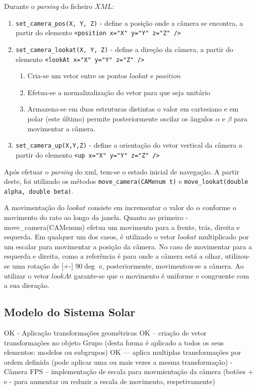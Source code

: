 \documentclass[runningheads]{llncs}
\begin{document}
Durante o \textit{parsing} do ficheiro $XML$:
\begin{enumerate}
    \item \texttt{set_camera_pos(X, Y, Z)} - define a posição onde a câmera se encontra,
    a partir do elemento \texttt{<position x="X" y="Y" z="Z" />}
    \item \texttt{set_camera_lookat(X, Y, Z)} - define a direção da câmera,
    a partir do elemento \texttt{<lookAt x="X" y="Y" z="Z" />}
    \begin{enumerate}
        \item Cria-se um vetor entre os pontos $lookat$ e $position$
        \item Efetua-se a normalizalização do vetor para que seja unitário
        \item Armazena-se em duas estruturas distintas o valor em cartesiano e em polar
        (este último) permite posteriormente oscilar os ângulos $\alpha$ e $\beta$ para movimentar a câmera.
    \end{enumerate}
    \item \texttt{set_camera_up(X,Y,Z)} - define a orientação do vetor vertical da câmera a partir do 
    elemento \texttt{<up x="X" y="Y" z="Z" />}
\end{enumerate}

Após efetuar o \textit{parsing} do xml, tem-se o estado inicial de navegação.
A partir deste, foi utilizado os métodos \texttt{move_camera(CAMenum t)} e
\texttt{move_lookat(double alpha, double beta)}.

A movimentação do $lookat$ consiste em incrementar o valor do $\alpha$ conforme o movimento do 
rato ao longo da janela.
Quanto ao primeiro - move_camera(CAMenum) efetua um movimento para a frente, trás, direita e esquerda.
Em qualquer um dos casos, é utilizado o vetor $lookat$ multiplicado por um escalar para movimentar a posição da câmera.
No caso de movimentar para a esquerda e direita, como a referência é para onde a câmera está a olhar,
utilizou-se uma rotação de [+-] 90$\deg$ e, posteriormente, movimentou-se a câmera.
Ao utilizar o vetor $lookAt$ garante-se que o movimento é uniforme e congruente com a sua dieração.

\subsection{Modelo do Sistema Solar} \label{sec:modelo_ss}
OK - Aplicação transformações geométricas
OK -- criação de vetor transformações no objeto Grupo (desta forma é aplicado a todos os seus elementos: modelos ou subgrupos)
OK --- aplica multiplas transformações por ordem definida (pode aplicar uma ou mais vezes a mesma transformação)
- Câmera FPS
-- implementação de escala para movmientação da câmera (botões + e - para aumentar ou reduzir a escala de movimento, respetivamente)
\end{document}

